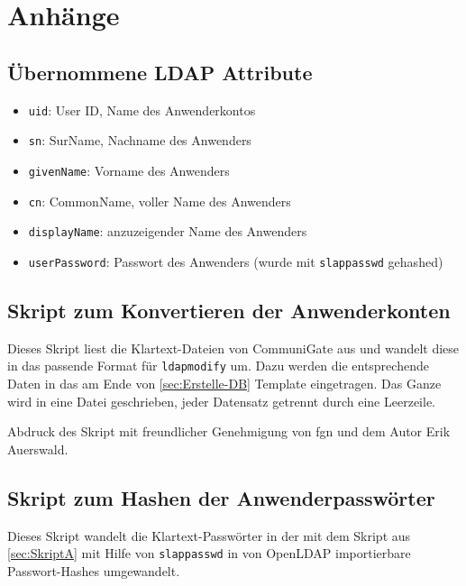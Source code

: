 \documentclass[11pt,a4paper,titlepage=firstiscover,headsepline,bibtotoc]{scrartcl} %
\begin{document}
%
%



\appendix
\newpage
\section{Anhänge}
\subsection{Übernommene LDAP Attribute} \label{sec:LDAP-Attribute}
\begin{itemize}
\item\texttt{uid}: User ID, Name des Anwenderkontos
\item\texttt{sn}: SurName, Nachname des Anwenders
\item\texttt{givenName}: Vorname des Anwenders
\item\texttt{cn}: CommonName, voller Name des Anwenders
\item\texttt{displayName}: anzuzeigender Name des Anwenders
\item\texttt{userPassword}: Passwort des Anwenders (wurde mit \texttt{slappasswd} gehashed)
\end{itemize}


\newpage
\subsection{Skript zum Konvertieren der Anwenderkonten}\label{sec:SkriptA}

Dieses Skript liest die Klartext-Dateien von CommuniGate aus und wandelt diese in das passende Format für \texttt{ldapmodify} um. Dazu werden die entsprechende Daten in das am Ende von \autoref{sec:Erstelle-DB} Template eingetragen. Das Ganze wird in eine Datei geschrieben, jeder Datensatz getrennt durch eine Leerzeile.

Abdruck des Skript mit freundlicher Genehmigung von fgn und dem Autor Erik Auerswald.

\newpage
\subsection{Skript zum Hashen der Anwenderpasswörter}\label{sec:SkriptB}

Dieses Skript wandelt die Klartext-Passwörter in der mit dem Skript aus \autoref{sec:SkriptA} mit Hilfe von \texttt{slappasswd} in von OpenLDAP importierbare Passwort-Hashes umgewandelt.
\end{document}
